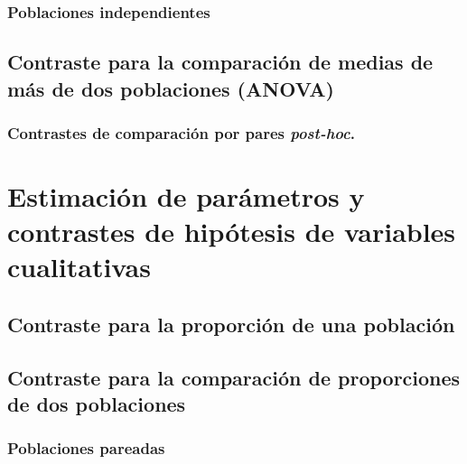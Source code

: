\documentclass[
]{book}
\theoremstyle{definition}
\theoremstyle{definition}
\theoremstyle{definition}
\theoremstyle{definition}
\theoremstyle{remark}
\begin{document}
\hypertarget{poblaciones-independientes}{%
\subsection{Poblaciones independientes}\label{poblaciones-independientes}}

\hypertarget{contraste-para-la-comparaciuxf3n-de-medias-de-muxe1s-de-dos-poblaciones-anova}{%
\section{Contraste para la comparación de medias de más de dos poblaciones (ANOVA)}\label{contraste-para-la-comparaciuxf3n-de-medias-de-muxe1s-de-dos-poblaciones-anova}}

\hypertarget{contrastes-de-comparaciuxf3n-por-pares-post-hoc.}{%
\subsection{\texorpdfstring{Contrastes de comparación por pares \emph{post-hoc}.}{Contrastes de comparación por pares post-hoc.}}\label{contrastes-de-comparaciuxf3n-por-pares-post-hoc.}}

\hypertarget{estimaciuxf3n-de-paruxe1metros-y-contrastes-de-hipuxf3tesis-de-variables-cualitativas}{%
\chapter{Estimación de parámetros y contrastes de hipótesis de variables cualitativas}\label{estimaciuxf3n-de-paruxe1metros-y-contrastes-de-hipuxf3tesis-de-variables-cualitativas}}

\hypertarget{contraste-para-la-proporciuxf3n-de-una-poblaciuxf3n}{%
\section{Contraste para la proporción de una población}\label{contraste-para-la-proporciuxf3n-de-una-poblaciuxf3n}}

\hypertarget{contraste-para-la-comparaciuxf3n-de-proporciones-de-dos-poblaciones}{%
\section{Contraste para la comparación de proporciones de dos poblaciones}\label{contraste-para-la-comparaciuxf3n-de-proporciones-de-dos-poblaciones}}

\hypertarget{poblaciones-pareadas-1}{%
\subsection{Poblaciones pareadas}\label{poblaciones-pareadas-1}}
\end{document}
